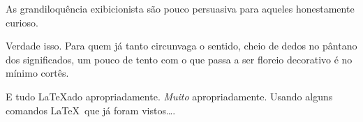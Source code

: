 As grandiloquência exibicionista são 
pouco persuasiva para aqueles honestamente 
curioso.
   
Verdade                           isso. 
Para         quem         já tanto 
circunvaga o sentido, cheio de dedos no 
pântano dos significados, um pouco de tento 
com o que passa a ser floreio decorativo é 
no mínimo cortês.

E tudo \LaTeX ado apropriadamente. 
\emph{Muito} apropriadamente.
Usando alguns comandos \LaTeX\ que já foram 
vistos\dots.
